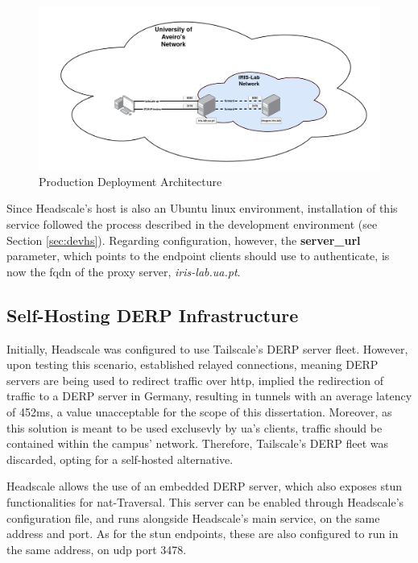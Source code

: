 \documentclass[11pt,twoside,a4paper]{report}
\begin{document}
\begin{figure}[h]
\centering
\includegraphics[width=\textwidth]{prod.png}
\caption{Production Deployment Architecture}
\label{fig:prodsolution}
\end{figure}

Since Headscale's host is also an Ubuntu linux environment, installation of this service followed the process described in the development environment (see Section \ref{sec:devhs}). Regarding configuration, however, the \textbf{server\_url} parameter, which points to the endpoint clients should use to authenticate, is now the \ac{fqdn} of the proxy server, \emph{iris-lab.ua.pt}.

\subsection{Self-Hosting DERP Infrastructure}

Initially, Headscale was configured to use Tailscale's \ac{DERP} server fleet. However, upon testing this scenario, established relayed connections, meaning \ac{DERP} servers are being used to redirect traffic over \ac{http}, implied the redirection of traffic to a \ac{DERP} server in Germany, resulting in tunnels with an average latency of 452ms, a value unacceptable for the scope of this dissertation. Moreover, as this solution is meant to be used exclusevly by \ac{ua}'s clients, traffic should be contained within the campus' network. Therefore, Tailscale's \ac{DERP} fleet was discarded, opting for a self-hosted alternative.

Headscale allows the use of an embedded \ac{DERP} server, which also exposes \ac{stun} functionalities for \ac{nat}-Traversal. This server can be enabled through Headscale's configuration file, and runs alongside Headscale's main service, on the same address and port. As for the \ac{stun} endpoints, these are also configured to run in the same address, on \ac{udp} port 3478.
\end{document}
